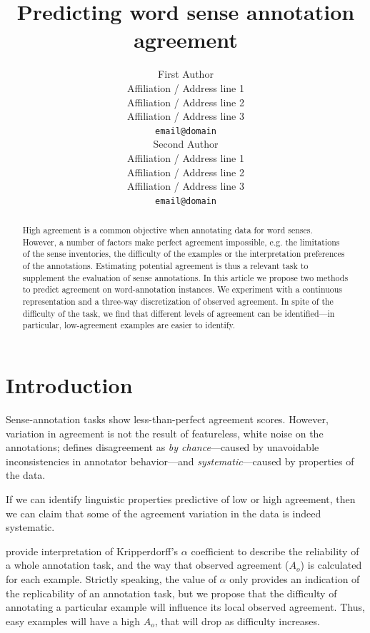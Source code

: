 \documentclass[11pt,a4paper]{article}
\title{Predicting word sense annotation agreement}
\author{First Author \\
  Affiliation / Address line 1 \\
  Affiliation / Address line 2 \\
  Affiliation / Address line 3 \\
  {\tt email@domain} \\\And
  Second Author \\
  Affiliation / Address line 1 \\
  Affiliation / Address line 2 \\
  Affiliation / Address line 3 \\
  {\tt email@domain} \\}
\date{}
\begin{document}
\maketitle
\begin{abstract}


High agreement is a common objective when annotating data for word senses.  
However, a number of factors make perfect agreement impossible, e.g. the limitations of the sense inventories, the difficulty of the examples or the interpretation preferences of the annotations.
Estimating potential agreement is thus a relevant task to supplement the evaluation of sense annotations.
In this article we propose two methods to predict agreement on word-annotation instances. We experiment with a continuous representation and a three-way discretization of observed agreement. In spite of the difficulty of the task, we find that different levels of agreement can be identified---in particular, low-agreement examples are easier to identify.
\end{abstract}
\section{Introduction}

Sense-annotation tasks show less-than-perfect agreement scores. However, variation in agreement is not the result of featureless, white noise on the annotations;  defines disagreement as \textit{by chance}---caused by unavoidable inconsistencies in annotator behavior---and \textit{systematic}---caused by properties of the data.

If we can identify linguistic properties predictive of low or high agreement, then we can claim that some of the agreement variation in the data is indeed systematic. %



 provide interpretation of Kripperdorff's $\alpha$ coefficient to describe the reliability of a whole annotation task, and the way that observed agreement ($A_o$) is calculated for each example. Strictly speaking, the value of $\alpha$ only provides an indication of the replicability of an annotation task, but we propose that the difficulty of annotating a particular example will influence its local observed agreement. Thus, easy examples will have a high $A_o$, that will drop as difficulty increases. 
\end{document}
